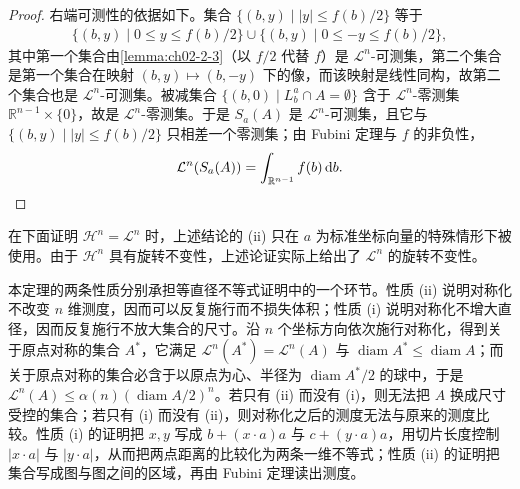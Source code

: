 \documentclass[../../main.tex]{subfiles}%
\begin{document}
\begin{proof}
右端可测性的依据如下。集合 $\{(b,y)\mid |y|\leqslant f(b)/2\}$ 等于
\begin{align*}
\{(b,y)\mid 0\leqslant y\leqslant f(b)/2\}\cup\{(b,y)\mid 0\leqslant-y\leqslant f(b)/2\},
\end{align*}
其中第一个集合由\cref{lemma:ch02-2-3}（以 $f/2$ 代替 $f$）是 $\mathcal{L}^n$-可测集，第二个集合是第一个集合在映射 $(b,y)\mapsto(b,-y)$ 下的像，而该映射是线性同构，故第二个集合也是 $\mathcal{L}^n$-可测集。被减集合 $\{(b,0)\mid L_b^a\cap A=\emptyset\}$ 含于 $\mathcal{L}^n$-零测集 $\mathbb{R}^{n-1}\times\{0\}$，故是 $\mathcal{L}^n$-零测集。于是 $S_a(A)$ 是 $\mathcal{L}^n$-可测集，且它与 $\{(b,y)\mid |y|\leqslant f(b)/2\}$ 只相差一个零测集；由 Fubini 定理与 $f$ 的非负性，%
\begin{align*}
\mathcal{L}^n(S_a(A))=\int_{\mathbb{R}^{n-1}}f(b)\,\mathrm{d} b .
\end{align*}
\end{proof}

\begin{remark}\label{remark:ch02-thm-2-3-旋转不变性}
在下面证明 $\mathcal{H}^n=\mathcal{L}^n$ 时，上述结论的 (ii) 只在 $a$ 为标准坐标向量的特殊情形下被使用。由于 $\mathcal{H}^n$ 具有旋转不变性，上述论证实际上给出了 $\mathcal{L}^n$ 的旋转不变性。
\end{remark}

\begin{remark}\label{remark:ch02-thm-2-3-动机}
本定理的两条性质分别承担等直径不等式证明中的一个环节。性质 (ii) 说明对称化不改变 $n$ 维测度，因而可以反复施行而不损失体积；性质 (i) 说明对称化不增大直径，因而反复施行不放大集合的尺寸。沿 $n$ 个坐标方向依次施行对称化，得到关于原点对称的集合 $A^*$，它满足 $\mathcal{L}^n(A^*)=\mathcal{L}^n(A)$ 与 $\operatorname{diam}A^*\leqslant\operatorname{diam}A$；而关于原点对称的集合必含于以原点为心、半径为 $\operatorname{diam}A^*/2$ 的球中，于是 $\mathcal{L}^n(A)\leqslant\alpha(n)(\operatorname{diam}A/2)^n$。若只有 (ii) 而没有 (i)，则无法把 $A$ 换成尺寸受控的集合；若只有 (i) 而没有 (ii)，则对称化之后的测度无法与原来的测度比较。性质 (i) 的证明把 $x,y$ 写成 $b+(x\cdot a)a$ 与 $c+(y\cdot a)a$，用切片长度控制 $|x\cdot a|$ 与 $|y\cdot a|$，从而把两点距离的比较化为两条一维不等式；性质 (ii) 的证明把集合写成图与图之间的区域，再由 Fubini 定理读出测度。
\end{remark}
\end{document}

